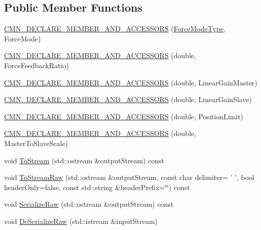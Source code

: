 \subsection*{Public Member Functions}
\begin{DoxyCompactItemize}
\item 
\hyperlink{classrob_collaborative_control_force_1_1_parameter_type_a3729d74e7903eea510b94d8facae00e0}{C\-M\-N\-\_\-\-D\-E\-C\-L\-A\-R\-E\-\_\-\-M\-E\-M\-B\-E\-R\-\_\-\-A\-N\-D\-\_\-\-A\-C\-C\-E\-S\-S\-O\-R\-S} (\hyperlink{classrob_collaborative_control_force_1_1_parameter_type_ab4ec71e97ffffd412993ea4f307e9acf}{Force\-Mode\-Type}, Force\-Mode)
\item 
\hyperlink{classrob_collaborative_control_force_1_1_parameter_type_a5e9e9bc1b7c3f35e98565ca17e1e1eaf}{C\-M\-N\-\_\-\-D\-E\-C\-L\-A\-R\-E\-\_\-\-M\-E\-M\-B\-E\-R\-\_\-\-A\-N\-D\-\_\-\-A\-C\-C\-E\-S\-S\-O\-R\-S} (double, Force\-Feedback\-Ratio)
\item 
\hyperlink{classrob_collaborative_control_force_1_1_parameter_type_ae5a2b5cc469e98da42afdfb4e464af92}{C\-M\-N\-\_\-\-D\-E\-C\-L\-A\-R\-E\-\_\-\-M\-E\-M\-B\-E\-R\-\_\-\-A\-N\-D\-\_\-\-A\-C\-C\-E\-S\-S\-O\-R\-S} (double, Linear\-Gain\-Master)
\item 
\hyperlink{classrob_collaborative_control_force_1_1_parameter_type_a514a93f3a329e401cf610ea701a1cfae}{C\-M\-N\-\_\-\-D\-E\-C\-L\-A\-R\-E\-\_\-\-M\-E\-M\-B\-E\-R\-\_\-\-A\-N\-D\-\_\-\-A\-C\-C\-E\-S\-S\-O\-R\-S} (double, Linear\-Gain\-Slave)
\item 
\hyperlink{classrob_collaborative_control_force_1_1_parameter_type_ad35007668c536c37668daecb13604865}{C\-M\-N\-\_\-\-D\-E\-C\-L\-A\-R\-E\-\_\-\-M\-E\-M\-B\-E\-R\-\_\-\-A\-N\-D\-\_\-\-A\-C\-C\-E\-S\-S\-O\-R\-S} (double, Position\-Limit)
\item 
\hyperlink{classrob_collaborative_control_force_1_1_parameter_type_a0cd2861b7e07317b3bc0833d5c014eff}{C\-M\-N\-\_\-\-D\-E\-C\-L\-A\-R\-E\-\_\-\-M\-E\-M\-B\-E\-R\-\_\-\-A\-N\-D\-\_\-\-A\-C\-C\-E\-S\-S\-O\-R\-S} (double, Master\-To\-Slave\-Scale)
\item 
void \hyperlink{classrob_collaborative_control_force_1_1_parameter_type_a42d756d52be5b88c5a31c429dd846e92}{To\-Stream} (std\-::ostream \&output\-Stream) const 
\item 
void \hyperlink{classrob_collaborative_control_force_1_1_parameter_type_a57de68744b1fc58013d95adaba398e07}{To\-Stream\-Raw} (std\-::ostream \&output\-Stream, const char delimiter= ' ', bool header\-Only=false, const std\-::string \&header\-Prefix=\char`\"{}\char`\"{}) const 
\item 
void \hyperlink{classrob_collaborative_control_force_1_1_parameter_type_a5d5eed3b0e7a2c6f4dfc725bb21d03cb}{Serialize\-Raw} (std\-::ostream \&output\-Stream) const 
\item 
void \hyperlink{classrob_collaborative_control_force_1_1_parameter_type_a5f5427db7146cd28cab1ea939573f229}{De\-Serialize\-Raw} (std\-::istream \&input\-Stream)
\end{DoxyCompactItemize}


